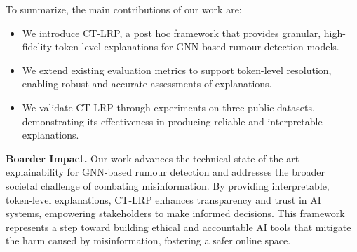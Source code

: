 
To summarize, the main contributions of our work are: \begin{itemize} 
    \item We introduce CT-LRP, a post hoc framework that provides granular, high-fidelity token-level explanations for GNN-based rumour detection models.
    \item We extend existing evaluation metrics to support token-level resolution, enabling robust and accurate assessments of explanations. 
    \item We validate CT-LRP through experiments on three public datasets, demonstrating its effectiveness in producing reliable and interpretable explanations.
\end{itemize}

\textbf{Boarder Impact.} Our work advances the technical state-of-the-art explainability for GNN-based rumour detection and addresses the broader societal challenge of combating misinformation. By providing interpretable, token-level explanations, CT-LRP enhances transparency and trust in AI systems, empowering stakeholders to make informed decisions. This framework represents a step toward building ethical and accountable AI tools that mitigate the harm caused by misinformation, fostering a safer online space.


